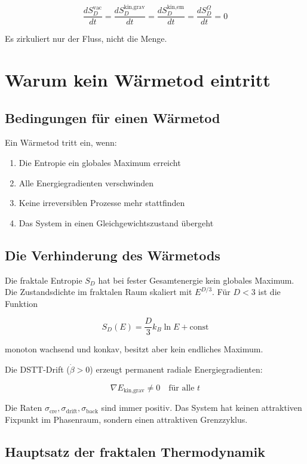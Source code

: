 \[
\frac{dS_D^{\text{vac}}}{dt} = \frac{dS_D^{\text{kin,grav}}}{dt} = \frac{dS_D^{\text{kin,em}}}{dt} = \frac{dS_D^{\Omega}}{dt} = 0
\]

Es zirkuliert nur der Fluss, nicht die Menge.

\section{Warum kein Wärmetod eintritt}
\label{sec:entropie_waermetod}

\subsection{Bedingungen für einen Wärmetod}
\label{sub:entropie_waermetod_bedingungen}

Ein Wärmetod tritt ein, wenn:

\begin{enumerate}
    \item Die Entropie ein globales Maximum erreicht
    \item Alle Energiegradienten verschwinden
    \item Keine irreversiblen Prozesse mehr stattfinden
    \item Das System in einen Gleichgewichtszustand übergeht
\end{enumerate}

\subsection{Die Verhinderung des Wärmetods}
\label{sub:entropie_verhinderung}

Die fraktale Entropie \( S_D \) hat bei fester Gesamtenergie kein globales Maximum. Die Zustandsdichte im fraktalen Raum skaliert mit \( E^{D/3} \). Für \( D < 3 \) ist die Funktion

\[
S_D(E) = \frac{D}{3}k_B \ln E + \text{const}
\]

monoton wachsend und konkav, besitzt aber kein endliches Maximum.

Die DSTT-Drift (\( \dot{\beta} > 0 \)) erzeugt permanent radiale Energiegradienten:

\[
\nabla E_{\text{kin,grav}} \neq 0 \quad \text{für alle } t
\]

Die Raten \( \sigma_{\text{cre}}, \sigma_{\text{drift}}, \sigma_{\text{back}} \) sind immer positiv. Das System hat keinen attraktiven Fixpunkt im Phasenraum, sondern einen attraktiven Grenzzyklus.

\subsection{Hauptsatz der fraktalen Thermodynamik}
\label{sub:entropie_hauptsatz}

